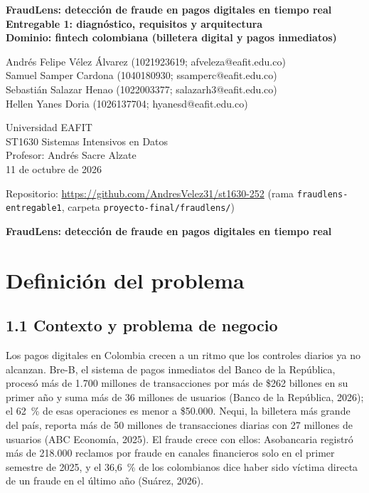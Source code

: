 \documentclass[12pt,letterpaper]{article}
\begin{document}
\thispagestyle{plain}
\vspace*{1.4in}
\begin{center}
{\bfseries FraudLens: detección de fraude en pagos digitales en tiempo real\\[2pt]
Entregable 1: diagnóstico, requisitos y arquitectura\\[2pt]
Dominio: fintech colombiana (billetera digital y pagos inmediatos)}

\vspace{0.45in}
Andrés Felipe Vélez Álvarez (1021923619; afveleza@eafit.edu.co)\\
Samuel Samper Cardona (1040180930; ssamperc@eafit.edu.co)\\
Sebastián Salazar Henao (1022003377; salazarh3@eafit.edu.co)\\
Hellen Yanes Doria (1026137704; hyanesd@eafit.edu.co)

\vspace{0.4in}
Universidad EAFIT\\
ST1630 Sistemas Intensivos en Datos\\
Profesor: Andrés Sacre Alzate\\
11 de octubre de 2026

\vspace{0.3in}
{\small{}Repositorio: \url{https://github.com/AndresVelez31/st1630-252} (rama \texttt{fraudlens-entregable1}, carpeta \texttt{proyecto-final/fraudlens/})}
\end{center}
\clearpage
{}

\begin{center}
{\bfseries FraudLens: detección de fraude en pagos digitales en tiempo real}
\end{center}

\section{Definición del problema}

\subsection*{1.1 Contexto y problema de negocio}

Los pagos digitales en Colombia crecen a un ritmo que los controles diarios ya no alcanzan. Bre-B, el sistema de pagos inmediatos del Banco de la República, procesó más de 1.700 millones de transacciones por más de \$262 billones en su primer año y suma más de 36 millones de usuarios (Banco de la República, 2026); el 62~\% de esas operaciones es menor a \$50.000. Nequi, la billetera más grande del país, reporta más de 50 millones de transacciones diarias con 27 millones de usuarios (ABC Economía, 2025). El fraude crece con ellos: Asobancaria registró más de 218.000 reclamos por fraude en canales financieros solo en el primer semestre de 2025, y el 36,6~\% de los colombianos dice haber sido víctima directa de un fraude en el último año (Suárez, 2026).
\end{document}

